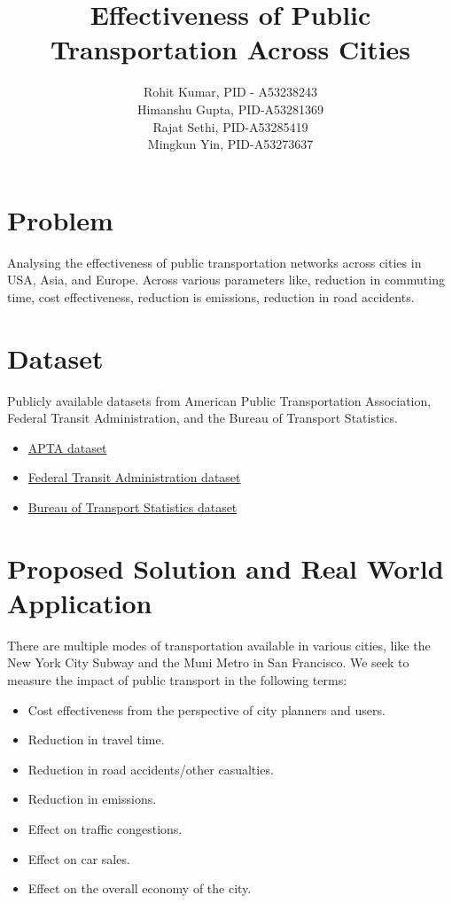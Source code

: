 \documentclass[a4paper]{article}
\begin{document}
\title{Effectiveness of Public Transportation Across Cities}
\author{Rohit Kumar, PID - A53238243\\ Himanshu Gupta, PID-A53281369\\Rajat Sethi, PID-A53285419\\ Mingkun Yin, PID-A53273637}
\maketitle

\section{Problem}
Analysing the effectiveness of public transportation networks across cities in USA, Asia, and Europe. Across various parameters like, reduction in commuting time, cost effectiveness, reduction is emissions, reduction in road accidents.
\section{Dataset}
Publicly available datasets from American Public Transportation Association, Federal Transit Administration, and the Bureau of Transport Statistics.
\begin{itemize}
    \item \href{https://www.apta.com/resources/statistics/Documents/Forms/AllItems.aspx?&&p_SortBehavior=0&p_FileLeafRef=2014-APTA-Fact-Book-Appendix-B%
    \item \href{https://www.transit.dot.gov/ntd/ntd-data}{Federal Transit Administration dataset}
    \item \href{https://www.bts.gov/}{Bureau of Transport Statistics dataset}
\end{itemize}

\section{Proposed Solution and Real World Application}
There are multiple modes of transportation available in various cities, like the New York City Subway and the Muni Metro in San Francisco. We seek to measure the impact of public transport in the following terms:
\begin{itemize}
    \item Cost effectiveness from the perspective of city planners and users.
    \item Reduction in travel time.
    \item Reduction in road accidents/other casualties.
    \item Reduction in emissions.
    \item Effect on traffic congestions.
    \item Effect on car sales.
    \item Effect on the overall economy of the city.
    
\end{itemize}
\end{document}
